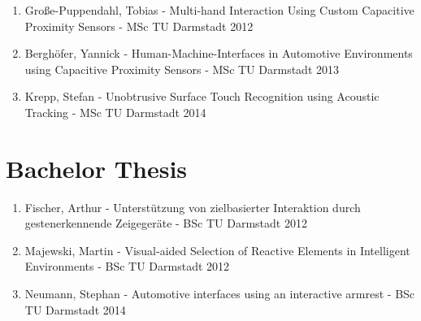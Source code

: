 \begin{appendix}
\begin{enumerate}
\item Große-Puppendahl, Tobias - Multi-hand Interaction Using Custom Capacitive Proximity Sensors - MSc TU Darmstadt 2012 
\item Berghöfer, Yannick - Human-Machine-Interfaces in Automotive Environments using Capacitive Proximity Sensors - MSc TU Darmstadt 2013
\item Krepp, Stefan - Unobtrusive Surface Touch Recognition using Acoustic Tracking - MSc TU Darmstadt 2014
\end{enumerate}

\section{Bachelor Thesis}

\begin{enumerate}
\item Fischer, Arthur - Unterstützung von zielbasierter Interaktion durch gestenerkennende Zeigegeräte - BSc TU Darmstadt 2012
\item Majewski, Martin - Visual-aided Selection of Reactive Elements in Intelligent Environments - BSc TU Darmstadt 2012
\item Neumann, Stephan - Automotive interfaces using an interactive armrest - BSc TU Darmstadt 2014
\end{enumerate}

 

\end{appendix}




